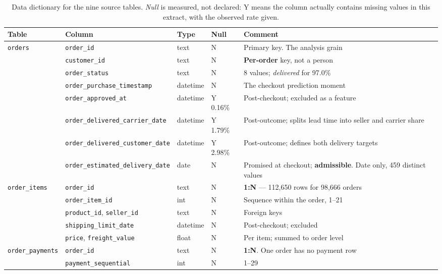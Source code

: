 \begin{table}[htbp]
\centering
\caption{Data dictionary for the nine source tables. \emph{Null} is measured,
not declared: Y means the column actually contains missing values in this
extract, with the observed rate given.}
\label{tab:dictionary}
\scriptsize
\setlength{\tabcolsep}{3.5pt}
\renewcommand{\arraystretch}{0.96}
\renewcommand{\code}[1]{\texttt{#1}}
\begin{tabular}{@{}p{2.1cm}p{4.4cm}p{1.15cm}p{1.05cm}p{5.35cm}@{}}
\toprule
\textbf{Table} & \textbf{Column} & \textbf{Type} & \textbf{Null} & \textbf{Comment} \\
\midrule
\code{orders} & \code{order\_id} & text & N & Primary key. The analysis grain \\
 & \code{customer\_id} & text & N & \textbf{Per-order} key, not a person \\
 & \code{order\_status} & text & N & 8 values; \emph{delivered} for 97.0\% \\
 & \code{order\_purchase\_timestamp} & datetime & N & The checkout prediction moment \\
 & \code{order\_approved\_at} & datetime & Y 0.16\% & Post-checkout; excluded as a feature \\
 & \code{order\_delivered\_carrier\_date} & datetime & Y 1.79\% & Post-outcome; splits lead time into seller and carrier share \\
 & \code{order\_delivered\_customer\_date} & datetime & Y 2.98\% & Post-outcome; defines both delivery targets \\
 & \code{order\_estimated\_delivery\_date} & date & N & Promised at checkout; \textbf{admissible}. Date only, 459 distinct values \\
\midrule
\code{order\_items} & \code{order\_id} & text & N & \textbf{1:N} --- 112,650 rows for 98,666 orders \\
 & \code{order\_item\_id} & int & N & Sequence within the order, 1--21 \\
 & \code{product\_id}, \code{seller\_id} & text & N & Foreign keys \\
 & \code{shipping\_limit\_date} & datetime & N & Post-checkout; excluded \\
 & \code{price}, \code{freight\_value} & float & N & Per item; summed to order level \\
\midrule
\code{order\_payments} & \code{order\_id} & text & N & \textbf{1:N}. One order has no payment row \\
 & \code{payment\_sequential} & int & N & 1--29 \\

\end{tabular}
\end{table}
